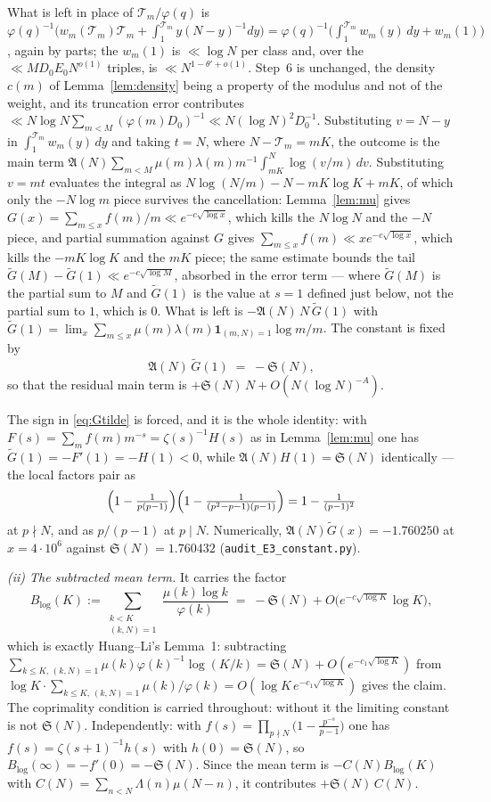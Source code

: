 \documentclass[11pt,a4paper]{article}
\theoremstyle{plain}
\theoremstyle{definition}
\theoremstyle{remark}
\renewcommand{\SS}{\mathfrak{S}}
\newcommand{\AAA}{\mathfrak{A}}
\newcommand{\Tcut}{\mathcal T}
\begin{document}
What is left in place of $\Tcut_m/\varphi(q)$ is
$\varphi(q)^{-1}\bigl(w_m(\Tcut_m)\Tcut_m+\int_1^{\Tcut_m}y(N-y)^{-1}dy
\bigr)=\varphi(q)^{-1}\bigl(\int_1^{\Tcut_m}w_m(y)\,dy+w_m(1)\bigr)$,
again by parts; the $w_m(1)$ is $\ll\log N$ per class and, over the
$\ll MD_0E_0N^{o(1)}$ triples, is $\ll N^{1-\theta'+o(1)}$. Step~6 is
unchanged, the density $c(m)$ of Lemma~\ref{lem:density} being a
property of the modulus and not of the weight, and its truncation
error contributes $\ll N\log N\sum_{m<M}(\varphi(m)D_0)^{-1}\ll
N(\log N)^{2}D_0^{-1}$. Substituting $v=N-y$ in
$\int_1^{\Tcut_m}w_m(y)\,dy$ and taking $t=N$, where
$N-\Tcut_m=mK$, the outcome is the main term
$\AAA(N)\sum_{m<M}\mu(m)\lambda(m)m^{-1}\int_{mK}^{N}\log(v/m)\,dv$.
Substituting $v=mt$ evaluates the integral as
$N\log(N/m)-N-mK\log K+mK$, of which only the $-N\log m$ piece
survives the cancellation: Lemma~\ref{lem:mu} gives
$G(x)=\sum_{m\le x}f(m)/m\ll e^{-c\sqrt{\log x}}$, which kills the
$N\log N$ and the $-N$ piece, and partial summation against $G$ gives
$\sum_{m\le x}f(m)\ll xe^{-c\sqrt{\log x}}$, which kills the
$-mK\log K$ and the $mK$ piece; the same estimate bounds the tail
$\widetilde G(M)-\widetilde G(1)\ll e^{-c\sqrt{\log M}}$, absorbed in
the error term --- where $\widetilde G(M)$ is the partial sum to $M$
and $\widetilde G(1)$ is the value at $s=1$ defined just below, not
the partial sum to $1$, which is $0$. What is left is
$-\AAA(N)\,N\,\widetilde G(1)$ with
$\widetilde G(1)=\lim_x\sum_{m\le x}\mu(m)\lambda(m)
\mathbf 1_{(m,N)=1}\log m/m$. The constant is fixed by
\begin{equation}\label{eq:Gtilde}
  \AAA(N)\,\widetilde G(1)\;=\;-\SS(N),
\end{equation}
so that the residual main term is $+\SS(N)\,N+O(N(\log N)^{-A})$.

The sign in \eqref{eq:Gtilde} is forced, and it is the whole identity:
with $F(s)=\sum_m f(m)m^{-s}=\zeta(s)^{-1}H(s)$ as in
Lemma~\ref{lem:mu} one has $\widetilde G(1)=-F'(1)=-H(1)<0$, while
$\AAA(N)H(1)=\SS(N)$ identically --- the local factors pair as
\[
  \Bigl(1-\tfrac{1}{p(p-1)}\Bigr)
  \Bigl(1-\tfrac{1}{(p^2-p-1)(p-1)}\Bigr)
  =1-\tfrac{1}{(p-1)^2}
\]
at $p\nmid N$, and as $p/(p-1)$ at $p\mid N$. Numerically,
$\AAA(N)\widetilde G(x)=-1.760250$ at $x=4\cdot10^6$ against
$\SS(N)=1.760432$ (\texttt{audit\_E3\_constant.py}).

\medskip\noindent
\emph{(ii) The subtracted mean term.} It carries the factor
\[
  B_{\log}(K):=\sum_{\substack{k<K\\ (k,N)=1}}
     \frac{\mu(k)\log k}{\varphi(k)}
  \;=\;-\SS(N)+O\bigl(e^{-c\sqrt{\log K}}\log K\bigr),
\]
which is exactly Huang--Li's Lemma~1: subtracting
$\sum_{k\le K,\,(k,N)=1}\mu(k)\varphi(k)^{-1}\log(K/k)
 =\SS(N)+O(e^{-c_1\sqrt{\log K}})$ from
$\log K\cdot\sum_{k\le K,\,(k,N)=1}\mu(k)/\varphi(k)
 =O(\log K\,e^{-c_1\sqrt{\log K}})$ gives the claim. The coprimality
condition is carried throughout: without it the limiting constant is
not $\SS(N)$. Independently:
with $f(s)=\prod_{p\nmid N}\bigl(1-\frac{p^{-s}}{p-1}\bigr)$ one has
$f(s)=\zeta(s+1)^{-1}h(s)$ with $h(0)=\SS(N)$, so
$B_{\log}(\infty)=-f'(0)=-\SS(N)$. Since the mean term is
$-C(N)B_{\log}(K)$ with $C(N)=\sum_{n<N}\Lambda(n)\mu(N-n)$, it
contributes $+\SS(N)\,C(N)$.
\end{document}
